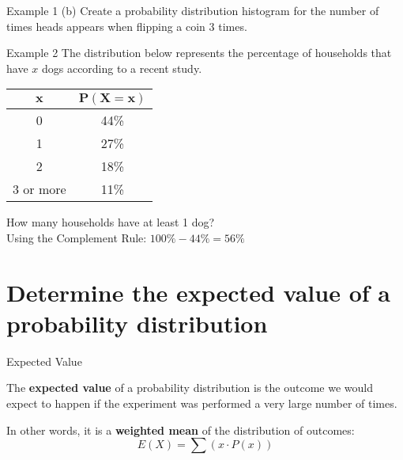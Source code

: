 \documentclass[t]{beamer}
\begin{document}
\begin{frame}{Example 1}
(b) \quad Create a probability distribution histogram for the number of times heads appears when flipping a coin 3 times.	\newline\\	\pause

\begin{center}
\end{center}
\end{frame}

\begin{frame}{Example 2}
The distribution below represents the percentage of households that have $x$ dogs according to a recent study. \newline
\begin{center}
\begin{tabular}{c|c}
$\bm{x}$ & $\bm{P(X=x)}$ \\ \hline
0 & 44\% \\
1 & 27\% \\
2 & 18\% \\
3 or more & 11\%
\end{tabular}
\end{center}
How many households have at least 1 dog?	\newline\\	\pause
Using the Complement Rule: $100\% - 44\% = 56\%$
\end{frame}

\section{Determine the expected value of a probability distribution}

\begin{frame}{Expected Value}
\begin{tcolorbox}[colframe=green!20!black, colback = green!30!white,title=\textbf{Expected Value}]
The \textbf{expected value} of a probability distribution is the outcome we would expect to happen if the experiment was performed a very large number of times.
\end{tcolorbox}
\vspace{10pt} \pause

In other words, it is a {\color{blue}\textbf{weighted mean}} of the distribution of outcomes:	\newline\\
\[E(X) = \sum \left(x \cdot P(x)\right) \]
\end{frame}
\end{document}
